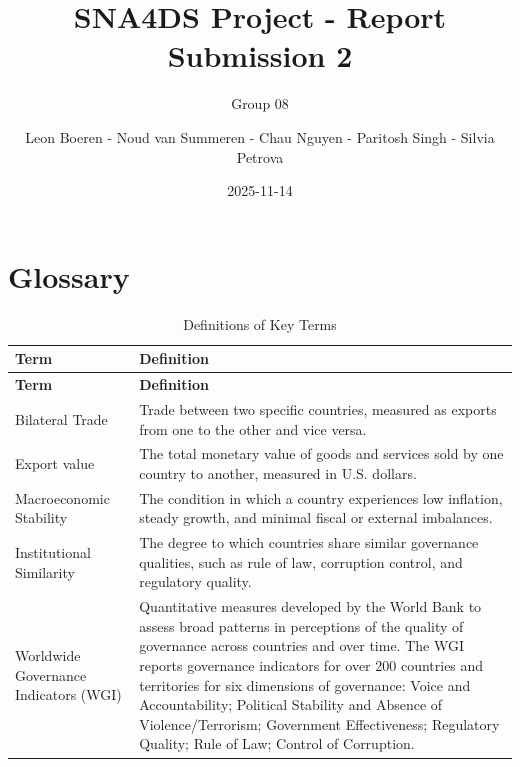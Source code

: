 \documentclass[
]{article}
\title{SNA4DS Project - Report Submission 2}
\subtitle{Group 08}
\author{Leon Boeren - Noud van Summeren - Chau Nguyen - Paritosh Singh -
Silvia Petrova}
\date{2025-11-14}
\renewcommand*\contentsname{Table of contents}
\newcommand\contentsname{Table of contents}
\begin{document}
\maketitle

\renewcommand*\contentsname{Table of contents}
{
\hypersetup{linkcolor=}
\setcounter{tocdepth}{2}
\tableofcontents
}

\newpage{}

\section*{Glossary}\label{glossary}

\label{sec-gloss}
\setlength{\arrayrulewidth}{0.05pt}
\begin{longtable}{p{} p{}}
\caption{Definitions of Key Terms}
\label{tab:key-terms-wgi} \\
\hline
\textbf{Term} & \textbf{Definition} \\
\hline
\endfirsthead

\hline
\textbf{Term} & \textbf{Definition} \\
\hline
\endhead

\hline
\endfoot

\hline
\endlastfoot

Bilateral Trade 
&
Trade between two specific countries, measured as exports from one to the other and vice versa. \\
\hline

Export value 
&
The total monetary value of goods and services sold by one country to another, measured in U.S. dollars. \\
\hline

Macroeconomic Stability 
&
The condition in which a country experiences low inflation, steady growth, and minimal fiscal or external imbalances. \\
\hline

Institutional Similarity 
&
The degree to which countries share similar governance qualities, such as rule of law, corruption control, and regulatory quality. \\
\hline

Worldwide Governance Indicators (WGI) 
&
Quantitative measures developed by the World Bank to assess broad patterns in perceptions of the quality of governance across countries and over time. The WGI reports governance indicators for over 200 countries and territories for six dimensions of governance: Voice and Accountability; Political Stability and Absence of Violence/Terrorism; Government Effectiveness; Regulatory Quality; Rule of Law; Control of Corruption. \\
\hline


\end{longtable}
\end{document}
